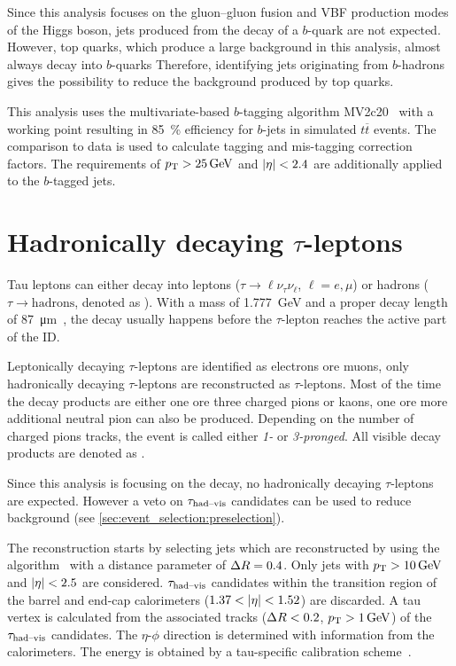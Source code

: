 Since this analysis focuses on the gluon--gluon fusion and VBF production modes of the Higgs boson, jets produced from
the decay of a $b$-quark are not expected.
However, top quarks, which produce a large background in this analysis, almost always decay into $b$-quarks
Therefore, identifying jets originating from $b$-hadrons gives the possibility to reduce the background produced by top quarks.

This analysis uses the multivariate-based $b$-tagging algorithm MV2c20~\cite{PERF-2012-04,ATL-PHYS-PUB-2016-012} with
a working point resulting in \SI{85}{\percent} efficiency for $b$-jets in simulated $t\overline{t}$ events.
The comparison to data is used to calculate tagging and mis-tagging correction factors.
The requirements of $\pt > \SI{25}{\GeV}$ and $\left|\eta\right| < 2.4$ are additionally applied to the $b$-tagged jets.


\section{Hadronically decaying  $\tau$-leptons}\label{sec:object_selection:tau_leptons}

Tau leptons can either decay into leptons ($\tau \to \ell \nu_\tau \nu_\ell$, $\ell = e, \mu$) or hadrons
($\tau \to \text{hadrons}$, denoted as \tauhad{}).
With a mass of \SI{1.777}{\GeV} and a proper decay length of \SI{87}{\um}~\cite{PDG}, the decay usually happens before
the $\tau$-lepton reaches the active part of the ID\@.

Leptonically decaying $\tau$-leptons are identified as electrons ore muons, only hadronically decaying $\tau$-leptons are reconstructed as $\tau$-leptons.
Most of the time the decay products are either one ore three charged pions or kaons, one ore more additional neutral pion can also be produced.
Depending on the number of charged pions tracks, the event is called either \emph{1-} or \emph{3-pronged}.
All visible decay products are denoted as \tauhadvis{}.

Since this analysis is focusing on the \Httllfull{} decay, no hadronically decaying $\tau$-leptons are expected.
However a veto on $\tau_\text{had--vis}$ candidates can be used to reduce background (see \cref{sec:event_selection:preselection}).

The reconstruction starts by selecting jets which are reconstructed by using the \antikt{} algorithm~\cite{Cacciari:2008gp,Cacciari:2005hq}
with a distance parameter of $\Delta R = 0.4$.
Only jets with $\pt > \SI{10}{\GeV}$ and $\left|\eta\right| < 2.5$ are considered.
$\tau_\text{had--vis}$ candidates within the transition region of the barrel and end-cap calorimeters ($1.37 < \left|\eta\right| < 1.52$) are discarded.
A tau vertex is calculated from the associated tracks ($\Delta R < 0.2$, $\pt > \SI{1}{\GeV}$) of the $\tau_\text{had--vis}$ candidates.
The $\eta$-$\phi$ direction is determined with information from the calorimeters. %
The energy is  obtained by a tau-specific calibration scheme~\cite{Run1TauPaper}.

